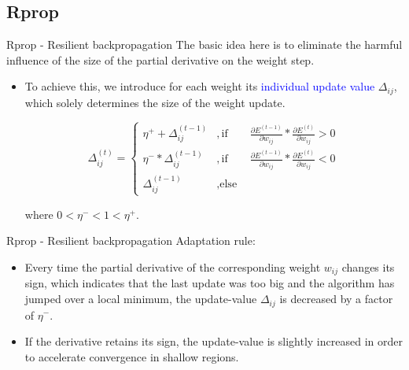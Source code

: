 \documentclass{beamer}
\begin{document}
\subsection{Rprop}
\begin{frame}{Rprop - Resilient backpropagation}
The basic idea here is to eliminate the harmful influence of the size of the partial derivative on the weight step. 

\pause
\begin{itemize}
\item To achieve this, we introduce for each weight its \textcolor{blue}{individual update value} $ \Delta_{ij} $, which solely determines the size of the weight update. 


\[
\Delta_{ij}^{(t)} = \begin{cases}
\eta^+ + \Delta_{ij}^{(t-1)} & ,  \text{if} \qquad \frac{\partial E^{(t-1)}}{\partial w_{ij}} * \frac{\partial E^{(t)}}{\partial w_{ij}} > 0 \\

\eta^- * \Delta_{ij}^{(t-1)} & ,  \text{if} \qquad \frac{\partial E^{(t-1)}}{\partial w_{ij}} * \frac{\partial E^{(t)}}{\partial w_{ij}} < 0 \\

\Delta_{ij}^{(t-1)} & ,  \text{else}

\end{cases}
\]

where $  0< \eta^- < 1 < \eta^+ $.




\end{itemize}
\end{frame}

\begin{frame}{Rprop - Resilient backpropagation}
Adaptation rule:
 
\begin{itemize}
\item Every time the partial derivative of the corresponding weight $ w_{ij} $ changes its sign, which indicates that the last update was too big and the algorithm has jumped over a local minimum, the update-value $ \Delta_{ij} $ is decreased by a factor of $ \eta^- $. 
\item If the derivative retains its sign, the update-value is slightly increased in order to accelerate convergence in shallow regions.  
\end{itemize}






\end{frame}
\end{document}

